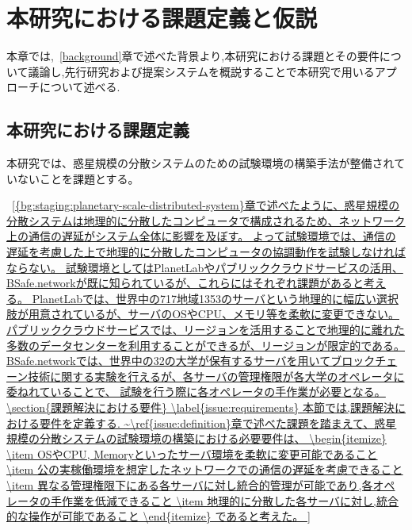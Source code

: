 \chapter{本研究における課題定義と仮説}
\label{issue}

本章では,~\ref{background}章で述べた背景より,本研究における課題とその要件について議論し,先行研究および提案システムを概説することで本研究で用いるアプローチについて述べる.

\section{本研究における課題定義}
\label{issue:definition}

本研究では、惑星規模の分散システムのための試験環境の構築手法が整備されていないことを課題とする。

~\ref{{bg:staging:planetary-scale-distributed-system}章で述べたように、惑星規模の分散システムは地理的に分散したコンピュータで構成されるため、ネットワーク上の通信の遅延がシステム全体に影響を及ぼす。
よって試験環境では、通信の遅延を考慮した上で地理的に分散したコンピュータの協調動作を試験しなければならない。
試験環境としてはPlanetLabやパブリッククラウドサービスの活用、BSafe.networkが既に知られているが、これらにはそれぞれ課題があると考える。
PlanetLabでは、世界中の717地域1353のサーバという地理的に幅広い選択肢が用意されているが、サーバのOSやCPU、メモリ等を柔軟に変更できない。
パブリッククラウドサービスでは、リージョンを活用することで地理的に離れた多数のデータセンターを利用することができるが、リージョンが限定的である。
BSafe.networkでは、世界中の32の大学が保有するサーバを用いてブロックチェーン技術に関する実験を行えるが、各サーバの管理権限が各大学のオペレータに委ねれていることで、
試験を行う際に各オペレータの手作業が必要となる。

\section{課題解決における要件}
\label{issue:requirements}

本節では,課題解決における要件を定義する.

~\ref{issue:definition}章で述べた課題を踏まえて、惑星規模の分散システムの試験環境の構築における必要要件は、
\begin{itemize}
  \item OSやCPU, Memoryといったサーバ環境を柔軟に変更可能であること
  \item 公の実稼働環境を想定したネットワークでの通信の遅延を考慮できること
  \item 異なる管理権限下にある各サーバに対し統合的管理が可能であり,各オペレータの手作業を低減できること
  \item 地理的に分散した各サーバに対し,統合的な操作が可能であること
\end{itemize}
であると考えた。

}
